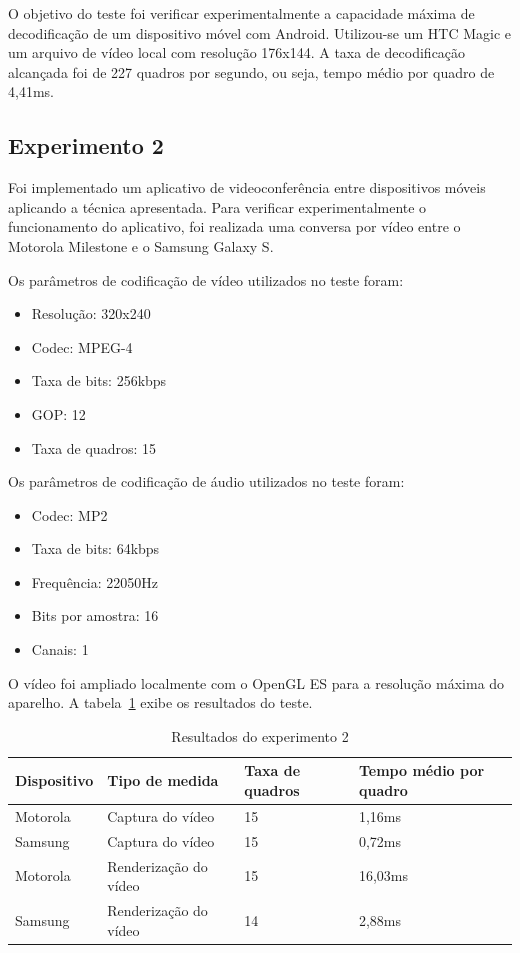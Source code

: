 \documentclass{acm_proc_article-sp}
\begin{document}
O objetivo do teste foi verificar experimentalmente a capacidade máxima de decodificação de um dispositivo móvel com Android. Utilizou-se um HTC Magic e um arquivo de vídeo local com resolução 176x144. A taxa de decodificação alcançada foi de 227 quadros por segundo, ou seja, tempo médio por quadro de 4,41ms.

\subsection{Experimento 2}
Foi implementado um aplicativo de videoconferência entre dispositivos móveis aplicando a técnica apresentada. Para verificar experimentalmente o funcionamento do aplicativo, foi realizada uma conversa por vídeo entre o Motorola Milestone e o Samsung Galaxy S.

Os parâmetros de codificação de vídeo utilizados no teste foram:
\begin{itemize}
 \item Resolução: 320x240
 \item Codec: MPEG-4
 \item Taxa de bits: 256kbps
 \item GOP: 12
 \item Taxa de quadros: 15
\end{itemize}

Os parâmetros de codificação de áudio utilizados no teste foram:
\begin{itemize}
 \item Codec: MP2
 \item Taxa de bits: 64kbps
 \item Frequência: 22050Hz
 \item Bits por amostra: 16
 \item Canais: 1
\end{itemize}

O vídeo foi ampliado localmente com o OpenGL ES para a resolução máxima do aparelho. A tabela~\ref{tabela_teste2} exibe os resultados do teste.

\begin{table}[htp]
\centering
\caption{Resultados do experimento 2}
\label{tabela_teste2}
\begin{tabular}{|p{1.5cm}|p{2.5cm}|p{1.2cm}|p{1.2cm}|} \hline
Dispositivo&Tipo de medida&Taxa de quadros&Tempo médio por quadro\\ \hline
Motorola&Captura do vídeo&15&1,16ms\\ \hline
Samsung&Captura do vídeo&15&0,72ms\\ \hline
Motorola&Renderização do vídeo&15&16,03ms\\ \hline
Samsung&Renderização do vídeo&14&2,88ms\\ \hline
\end{tabular}
\end{table}
\end{document}
